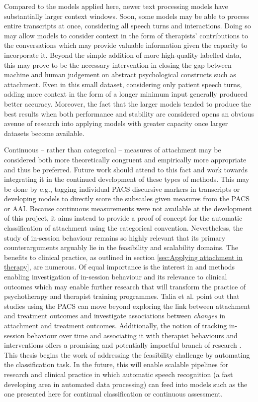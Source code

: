 \documentclass[12pt]{report}
\begin{document}
Compared to the models applied here, newer text processing models have substantially larger context windows.
Soon, some models may be able to process entire transcripts at once, considering all speech turns and interactions.
Doing so may allow models to consider context in the form of therapists' contributions to the conversations which may provide valuable information given the capacity to incorporate it.
Beyond the simple addition of more high-quality labelled data, this may prove to be the necessary intervention in closing the gap between machine and human judgement on abstract psychological constructs such as attachment.
Even in this small dataset, considering only patient speech turns, adding more context in the form of a longer minimum input generally produced better accuracy.
Moreover, the fact that the larger models tended to produce the best results when both performance and stability are considered opens an obvious avenue of research into applying models with greater capacity once larger datasets become available.

Continuous -- rather than categorical -- measures of attachment may be considered both more theoretically congruent and empirically more appropriate and thus be preferred.
Future work should attend to this fact and work towards integrating it in the continued development of these types of methods.
This may be done by e.g., tagging individual PACS discursive markers in transcripts or developing models to directly score the subscales given measures from the PACS or AAI.
Because continuous measurements were not available at the development of this project, it aims instead to provide a proof of concept for the automatic classification of attachment using the categorical convention.
Nevertheless, the study of in-session behaviour remains so highly relevant that its primary counterarguments arguably lie in the feasibility and scalability domains.
The benefits to clinical practice, as outlined in section \ref{sec:Applying attachment in therapy}, are numerous.
Of equal importance is the interest in and methods enabling investigation of in-session behaviour and its relevance to clinical outcomes which may enable further research that will transform the practice of psychotherapy and therapist training programmes.
Talia et al. \citeyear{Talia2017} point out that studies using the PACS can move beyond exploring the link between attachment and treatment outcomes and investigate associations between \textit{changes} in attachment and treatment outcomes.
Additionally, the notion of tracking in-session behaviour over time and associating it with therapist behaviours and interventions offers a promising and potentially impactful branch of research \cite{Slade2016, Talia2017}.
This thesis begins the work of addressing the feasibility challenge by automating the classification task.
In the future, this will enable scalable pipelines for research and clinical practice in which automatic speech recognition (a fast developing area in automated data processing) can feed into models such as the one presented here for continual classification or continuous assessment.
\end{document}
